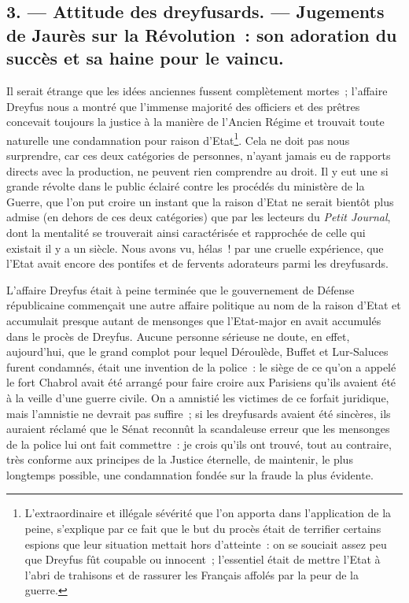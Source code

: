 \documentclass[french,twoside]{book} %
\begin{document}
\subsection[{3. — Attitude des dreyfusards. — Jugements de Jaurès sur la Révolution : son adoration du succès et sa haine pour le vaincu.}]{3. — Attitude des dreyfusards. — Jugements de Jaurès sur la Révolution : son adoration du succès et sa haine pour le vaincu.}
\label{p13}
\noindent Il serait étrange que les idées anciennes fussent complètement mortes ; l’affaire Dreyfus nous a montré que l’immense majorité des officiers et des prêtres concevait toujours la justice à la manière de l’Ancien Régime et trouvait toute naturelle une condamnation pour raison d’Etat\footnote{ \noindent L’extraordinaire et illégale sévérité que l’on apporta dans l’application de la peine, s’explique par ce fait que le but du procès était de terrifier certains espions que leur situation mettait hors d’atteinte : on se souciait assez peu que Dreyfus fût coupable ou innocent ; l’essentiel était de mettre l’Etat à l’abri de trahisons et de rassurer les Français affolés par la peur de la guerre.
 }. Cela ne doit pas nous surprendre, car ces deux catégories de personnes, n’ayant jamais eu de rapports directs avec la production, ne peuvent rien comprendre au droit. Il y eut une si grande révolte dans le public éclairé contre les procédés du ministère de la Guerre, que l’on put croire un instant que la raison d’Etat ne serait bientôt plus admise (en dehors de ces deux catégories) que par les lecteurs du \emph{Petit Journal}, dont la mentalité se trouverait ainsi caractérisée et rapprochée de celle qui existait il y a un siècle. Nous avons vu, hélas ! par une  cruelle expérience, que l’Etat avait encore des pontifes et de fervents adorateurs parmi les dreyfusards.\par
L’affaire Dreyfus était à peine terminée que le gouvernement de Défense républicaine commençait une autre affaire politique au nom de la raison d’Etat et accumulait presque autant de mensonges que l’Etat-major en avait accumulés dans le procès de Dreyfus. Aucune personne sérieuse ne doute, en effet, aujourd’hui, que le grand complot pour lequel Déroulède, Buffet et Lur-Saluces furent condamnés, était une invention de la police : le siège de ce qu’on a appelé le fort Chabrol avait été arrangé pour faire croire aux Parisiens qu’ils avaient été à la veille d’une guerre civile. On a amnistié les victimes de ce forfait juridique, mais l’amnistie ne devrait pas suffire ; si les dreyfusards avaient été sincères, ils auraient réclamé que le Sénat reconnût la scandaleuse erreur que les mensonges de la police lui ont fait commettre : je crois qu’ils ont trouvé, tout au contraire, très conforme aux principes de la Justice éternelle, de maintenir, le plus longtemps possible, une condamnation fondée sur la fraude la plus évidente.\par
\end{document}
